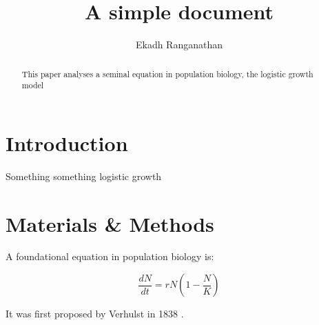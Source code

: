 \documentclass[12pt]{article}
\title{A simple document}
\author{Ekadh Ranganathan}
\date{}
\begin{document}
    \maketitle

    \begin{abstract}
        This paper analyses a seminal equation in population biology, the logistic growth model
    \end{abstract}

    \section{Introduction}
        Something something logistic growth 
    
    \section{Materials \& Methods}

    A foundational equation in population biology is:

    \begin{equation}
        \frac{dN}{dt} = r N (1-\frac{N}{K})
    \end{equation}

    It was first proposed by Verhulst in 1838 \cite{verhulst1838notice}.

    

    
\end{document}

